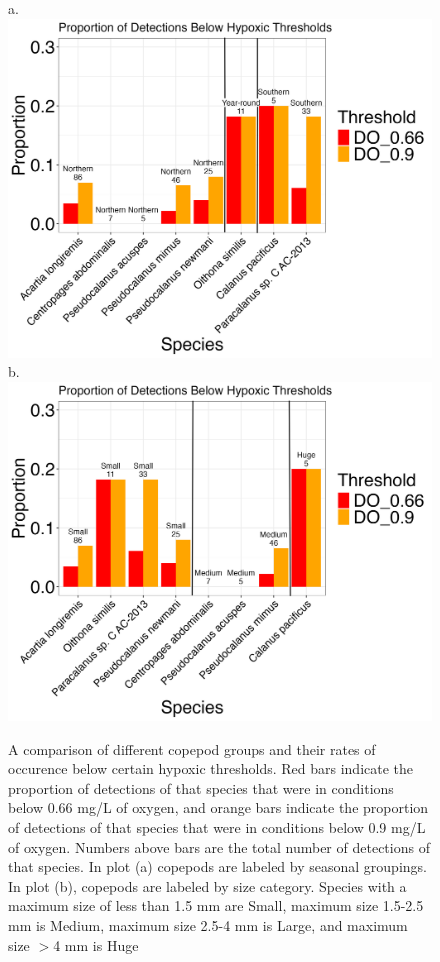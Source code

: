 \documentclass[12pt,twoside]{reedthesis}
\begin{document}
	\begin{figure}[!h]
		\begin{center}
			a. \includegraphics[scale=0.5]{Bar_Season} \\
			b. \includegraphics[scale=0.5]{Bar_Size}
			\caption[Proportion of Detections Below Hypoxic Thresholds]{\footnotesize{A comparison of different copepod groups and their rates of occurence below certain hypoxic thresholds. Red bars indicate the proportion of detections of that species that were in conditions below 0.66 mg/L of oxygen, and orange bars indicate the proportion of detections of that species that were in conditions below 0.9 mg/L of oxygen. Numbers above bars are the total number of detections of that species. In plot (a) copepods are labeled by seasonal groupings. In plot (b), copepods are labeled by size category. Species with a maximum size of less than 1.5 mm are Small, maximum size 1.5-2.5 mm is Medium, maximum size 2.5-4 mm is Large, and maximum size ${>}$4 mm is Huge \autocite{WoRMSWorldRegister}}} %
			\label{BarSeason}
		\end{center}
	\end{figure}    
	
\end{document}
